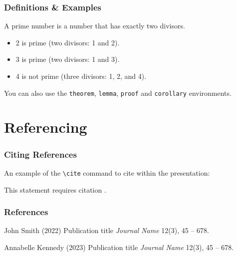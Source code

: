 \documentclass[
8pt, %
]{beamer}
\begin{document}
	\begin{frame}
		\frametitle{Definitions \& Examples}
		
		\begin{definition}
			A \alert{prime number} is a number that has exactly two divisors.
		\end{definition}
		
		\smallskip %
		
		\begin{example}
			\begin{itemize}
				\item 2 is prime (two divisors: 1 and 2).
				\item 3 is prime (two divisors: 1 and 3).
				\item 4 is not prime (\alert{three} divisors: 1, 2, and 4).
			\end{itemize}
		\end{example}
		
		\smallskip %
		
		You can also use the \texttt{theorem}, \texttt{lemma}, \texttt{proof} and \texttt{corollary} environments.
	\end{frame}

	\section{Referencing}
	
	\begin{frame}
		\frametitle{Citing References}
		
		An example of the \texttt{\textbackslash cite} command to cite within the presentation:
		
		\bigskip %
		
		This statement requires citation \cite{p1,p2}.
	\end{frame}
	
	
	\begin{frame} %
		\frametitle{References}
		
		\begin{thebibliography}{99} %
			\footnotesize %
			
			\bibitem[Smith, 2022]{p1}
			John Smith (2022)
			\newblock Publication title
			\newblock \emph{Journal Name} 12(3), 45 -- 678.
			
			\bibitem[Kennedy, 2023]{p2}
			Annabelle Kennedy (2023)
			\newblock Publication title
			\newblock \emph{Journal Name} 12(3), 45 -- 678.
		\end{thebibliography}
	\end{frame}
\end{document}
